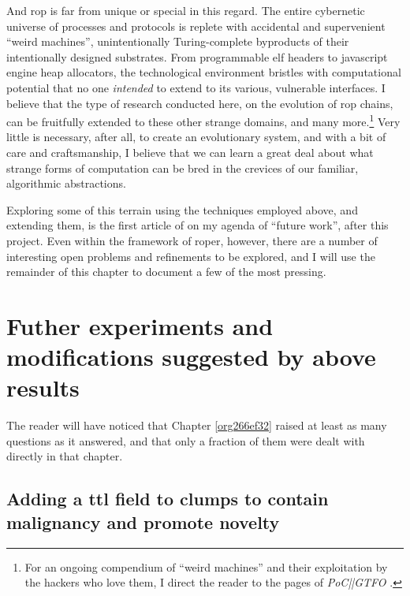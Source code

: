 \documentclass[12pt,glossary]{dalthesis}
\begin{document}
And \gls{rop} is far from unique or special in this regard. The entire cybernetic
universe of processes and protocols is replete with accidental and supervenient
``weird machines'', unintentionally Turing-complete byproducts of their intentionally
designed substrates. From programmable \gls{elf} headers to javascript engine heap
allocators, the technological environment bristles with computational potential
that no one \emph{intended} to extend to its various, vulnerable interfaces. I believe
that the type of research conducted here, on the evolution of \gls{rop} chains, can
be fruitfully extended to these other strange domains, and many more.\footnote{For an ongoing compendium of ``weird machines'' and their exploitation by the
  hackers who love them, I direct the reader to the pages of \emph{PoC||GTFO}
  \cite{pocorgtfo}.} Very little
is necessary, after all, to create an evolutionary system, and with a bit of care
and craftsmanship, I believe that we can learn a great deal about what strange
forms of computation can be bred in the crevices of our familiar, algorithmic
abstractions. 

Exploring some of this terrain using the techniques employed above, and
extending them, is the first article of on my agenda of ``future work'',
after this project. Even within the framework of \gls{roper}, however, there
are a number of interesting open problems and refinements to be explored,
and I will use the remainder of this chapter to document a few of the most
pressing.


\section{Futher experiments and modifications suggested by above results}
\label{sec:orgc26fb5e}

The reader will have noticed that Chapter \ref{org266ef32} raised at least
as many questions as it answered, and that only a fraction of them were dealt
with directly in that chapter. 

\subsection{Adding a \gls{ttl} field to clumps to contain malignancy and promote novelty}
\label{sec:org290ffe5}
\end{document}
